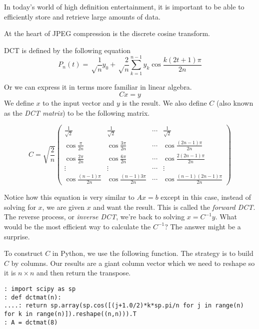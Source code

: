 

In today's world of high definition entertainment, it is important to be able to efficiently store and retrieve large amounts of data.

At the heart of JPEG compression is the discrete cosine transform. 

DCT is defined by the following equation
\begin{equation}
 P_n(t)=\sqrt\frac{1}{n}y_0+\sqrt\frac{2}{n}\sum_{k=1}^{n-1}y_k\cos\frac{k(2t+1)\pi}{2n}
\label{eqn:dct}
\end{equation}

Or we can express it in terms more familiar in linear algebra.
\[
Cx=y 
\]
We define $x$ to the input vector and $y$ is the result.  We also define $C$ (also known as the \emph{DCT matrix}) to be the following matrix.

\[
C=\sqrt{\frac{2}{n}}\begin{pmatrix}
 \frac{1}{\sqrt{2}} & \frac{1}{\sqrt{2}} & \cdots & \frac{1}{\sqrt{2}} \\
\cos\frac{\pi}{2n} & \cos\frac{3\pi}{2n} & \cdots & \cos\frac{(2n-1)\pi}{2n} \\
\cos\frac{2\pi}{2n} & \cos\frac{6\pi}{2n} & \cdots & \cos\frac{2(2n-1)\pi}{2n} \\
\vdots & \vdots & \cdots & \vdots \\
\cos\frac{(n-1)\pi}{2n} & \cos\frac{(n-1)3\pi}{2n} & \cdots & \cos\frac{(n-1)(2n-1)\pi}{2n}
\end{pmatrix}\]

Notice how this equation is very similar to $Ax=b$ except in this case, instead of solving for $x$, we are given $x$ and want the result.  This is called the \emph{forward DCT}.  The reverse process, or \emph{inverse DCT}, we're back to solving $x = C^{-1}y$.  What would be the most efficient way to calculate the $C^{-1}$?  The answer might be a surprise.

To construct $C$ in Python, we use the following function.  The strategy is to build $C$ by columns.  Our results are a giant column vector which we need to reshape so it is $n \times n$ and then return the transpose.
\begin{lstlisting}
: import scipy as sp
: def dctmat(n):
....: return sp.array(sp.cos([(j+1.0/2)*k*sp.pi/n for j in range(n) for k in range(n)]).reshape((n,n))).T
: A = dctmat(8)
\end{lstlisting}

